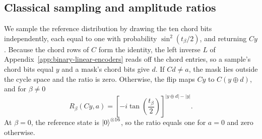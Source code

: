 \documentclass[pra,aps,10pt,twocolumn,floatfix,superscriptaddress, notitlepage,longbibliography]{revtex4-2}
\begin{document}
\subsection{Classical sampling and amplitude ratios}

We sample the reference distribution by drawing the ten chord bits independently, each equal to one with probability $\sin^2(t_\beta/2)$, and returning $Cy$. Because the chord rows of $C$ form the identity, the left inverse $L$ of Appendix~\ref{app:binary-linear-encoders} reads off the chord entries, so a sample's chord bits equal $y$ and a mask's chord bits give $d$. If $Cd\neq a$, the mask lies outside the cycle space and the ratio is zero. Otherwise, the flip maps $Cy$ to $C(y\oplus d)$, and for $\beta\neq0$
\begin{equation}
 R_\beta(Cy,a)=
 \left[-i\tan\!\left(\frac{t_\beta}{2}\right)\right]^{|y\oplus d|-|y|}.
\end{equation}
At $\beta=0$, the reference state is $\ket{0}^{\otimes16}$, so the ratio equals one for $a=0$ and zero otherwise.
\end{document}
